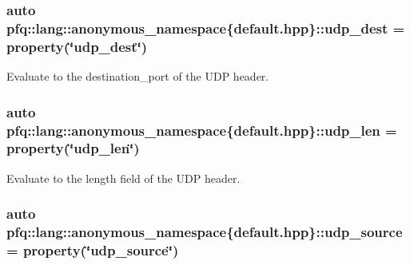 \subsubsection[{\texorpdfstring{udp\+\_\+dest}{udp_dest}}]{\setlength{\rightskip}{0pt plus 5cm}auto pfq\+::lang\+::anonymous\+\_\+namespace\{default.\+hpp\}\+::udp\+\_\+dest = {\bf property}(\char`\"{}udp\+\_\+dest\char`\"{})}\hypertarget{namespacepfq_1_1lang_1_1anonymous__namespace_02default_8hpp_03_a7c15d9ec0af24b9515acc8a04b7b1e2e}{}\label{namespacepfq_1_1lang_1_1anonymous__namespace_02default_8hpp_03_a7c15d9ec0af24b9515acc8a04b7b1e2e}


Evaluate to the {\ttfamily destination\+\_\+port} of the U\+DP header. 

\subsubsection[{\texorpdfstring{udp\+\_\+len}{udp_len}}]{\setlength{\rightskip}{0pt plus 5cm}auto pfq\+::lang\+::anonymous\+\_\+namespace\{default.\+hpp\}\+::udp\+\_\+len = {\bf property}(\char`\"{}udp\+\_\+len\char`\"{})}\hypertarget{namespacepfq_1_1lang_1_1anonymous__namespace_02default_8hpp_03_ac7f1ef80a8ec46ce01aa12f66cfee86b}{}\label{namespacepfq_1_1lang_1_1anonymous__namespace_02default_8hpp_03_ac7f1ef80a8ec46ce01aa12f66cfee86b}


Evaluate to the {\ttfamily length} field of the U\+DP header. 

\subsubsection[{\texorpdfstring{udp\+\_\+source}{udp_source}}]{\setlength{\rightskip}{0pt plus 5cm}auto pfq\+::lang\+::anonymous\+\_\+namespace\{default.\+hpp\}\+::udp\+\_\+source = {\bf property}(\char`\"{}udp\+\_\+source\char`\"{})}\hypertarget{namespacepfq_1_1lang_1_1anonymous__namespace_02default_8hpp_03_ab44590359ef60febe9bfc6465bcf932a}{}\label{namespacepfq_1_1lang_1_1anonymous__namespace_02default_8hpp_03_ab44590359ef60febe9bfc6465bcf932a}


